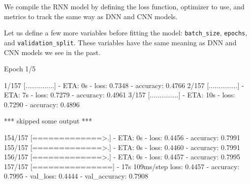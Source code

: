 \documentclass[12pt,]{krantz}
\makeatletter
\newenvironment{Shaded}{\begin{snugshade}}{\end{snugshade}}
\newcommand{\DataTypeTok}[1]{\textcolor[rgb]{0.27,0.27,0.27}{#1}}
\newcommand{\DecValTok}[1]{\textcolor[rgb]{0.06,0.06,0.06}{#1}}
\newcommand{\FloatTok}[1]{\textcolor[rgb]{0.06,0.06,0.06}{#1}}
\newcommand{\KeywordTok}[1]{\textcolor[rgb]{0.27,0.27,0.27}{\textbf{#1}}}
\newcommand{\NormalTok}[1]{#1}
\newcommand{\OperatorTok}[1]{\textcolor[rgb]{0.43,0.43,0.43}{\textbf{#1}}}
\newcommand{\StringTok}[1]{\textcolor[rgb]{0.5,0.5,0.5}{#1}}
\newenvironment{kframe}{%
\medskip{}
\setlength{\fboxsep}{.8em}
 \def\at@end@of@kframe{}%
 \ifinner\ifhmode%
  \def\at@end@of@kframe{\end{minipage}}%
  \begin{minipage}{\columnwidth}%
 \fi\fi%
 \def\FrameCommand##1{\hskip\@totalleftmargin \hskip-\fboxsep
 \colorbox{shadecolor}{##1}\hskip-\fboxsep
     \hskip-\linewidth \hskip-\@totalleftmargin \hskip\columnwidth}%
 \MakeFramed {\advance\hsize-\width
   \@totalleftmargin\z@ \linewidth\hsize
   \@setminipage}}%
 {\par\unskip\endMakeFramed%
 \at@end@of@kframe}
\renewenvironment{Shaded}{\begin{kframe}}{\end{kframe}}
\makeatother
\begin{document}
We compile the RNN model by defining the loss function, optimizer to use, and metrics to track the same way as DNN and CNN models.

\begin{Shaded}
\end{Shaded}

Let us define a few more variables before fitting the model: \texttt{batch\_size}, \texttt{epochs}, and \texttt{validation\_split}. These variables have the same meaning as DNN and CNN models we see in the past.

\begin{Shaded}
\end{Shaded}

\begin{Shaded}
\begin{Highlighting}[]
\NormalTok{Epoch 1/5}

\NormalTok{  1/157 [...............] - ETA: 0s - loss: 0.7348 - accuracy: 0.4766}
\NormalTok{  2/157 [...............] - ETA: 7s - loss: 0.7279 - accuracy: 0.4961}
\NormalTok{  3/157 [...............] - ETA: 10s - loss: 0.7290 - accuracy: 0.4896}

\NormalTok{*** skipped some output ***}

\NormalTok{154/157 [=============>.] - ETA: 0s - loss: 0.4456 - accuracy: 0.7991}
\NormalTok{155/157 [=============>.] - ETA: 0s - loss: 0.4460 - accuracy: 0.7991}
\NormalTok{156/157 [=============>.] - ETA: 0s - loss: 0.4457 - accuracy: 0.7995}
\NormalTok{157/157 [===============] - 17s 109ms/step }
\NormalTok{loss: 0.4457 - accuracy: 0.7995 - val_loss: 0.4444 - val_accuracy: 0.7908}
\end{Highlighting}
\end{Shaded}
\end{document}
